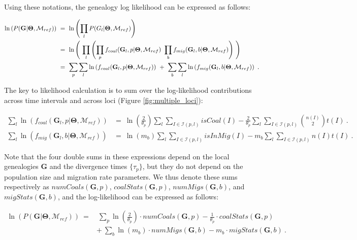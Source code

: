 \documentclass[11pt]{article}
\newcommand{\vect}[1]{\boldsymbol{\mathbf{#1}}}
\newcommand{\M}{\mathcal{M}}
\newcommand{\G}{\vect{G}}
\newcommand{\T}{\vect{\Theta}}
\newcommand{\Ip}{\mathcal{I}(p,l)}
\newcommand{\Ib}{\mathcal{I}(b,l)}
\newcommand{\Mref}{\M_{ref}}
\newcommand{\1}{\mathbbm{1}}
\begin{document}
Using these notations, the genealogy log likelihood can be expressed as follows:
%
%
\begin{small}
\begin{align}
\ln \left( P(\G| \T,\Mref) \right) ~&=~ \ln \left( \prod_{l}  P(G_l| \T,\Mref) \right)  \notag \\ 
%
&=~  \ln \left( ~\prod_{l}  \left( \prod_{p} f_{coal}(\G_l,p|\T,\Mref) ~ \prod_{b} f_{mig}(\G_l,b|\T,\Mref) \right) ~\right) \notag \\ 
%
&=~  \sum_{p}\sum_{l}\ln \left( f_{coal}(\G_l,p|\T,\Mref) \right) ~ + ~ \sum_{b}\sum_{l}\ln \left( f_{mig}(\G_l,b|\T,\Mref) \right)~. 
\label{eqn:ld-details}
\end{align}
\end{small}

The key to likelihood calculation is to sum over the log-likelihood contributions across time intervals and across loci (Figure \ref{fig:multiple_loci}):
%
%
\begin{small}
\begin{align}
\sum_{l}\ln \left( f_{coal}(\G_l,p|\T,\Mref) \right) &=~ %
\ln\left( \frac{2}{\theta_p}\right) \sum_{l} \sum_{I \in \Ip} isCoal(I)  - \frac{2}{\theta_p} \sum_{l} \sum_{I \in \Ip}{n(I)\choose 2}t(I) ~.
\label{eqn:ld-coal-stats}\\
\sum_{l}\ln \left( f_{mig}(\G_l,b|\T,\Mref) \right) &=~ %
\ln\left( m_b\right) \sum_{l} \sum_{I \in \Ip} isInMig(I)  - m_b \sum_{l} \sum_{I \in \Ip}n(I) t(I) ~.
\label{eqn:ld-mig-stats}
\end{align}
\end{small}

Note that the four double sums in these expressions depend on the local genealogies $\G$ and the divergence times $\{\tau_p\}$, but they do not depend on the population size and migration rate parameters. We thus denote these sums respectively as $numCoals(\G,p)$, $coalStats(\G,p)$,  $numMigs(\G,b)$, and $migStats(\G,b)$, and the log-likelihood can be expressed as follows:
%
%
\begin{small}
\begin{align}
\ln \left( P(\G| \T,\Mref) \right) ~=&~ \sum_{p}  \ln\left( \frac{2}{\theta_p}\right)\cdot numCoals(\G,p) - \frac{1}{\theta_p}\cdot coalStats(\G,p) \\
& +~ \sum_{b}  \ln\left( m_b\right)\cdot numMigs(\G,b) - m_b \cdot migStats(\G,b) ~. 
\label{eqn:ld-final}
\end{align}
\end{small}
\end{document}
